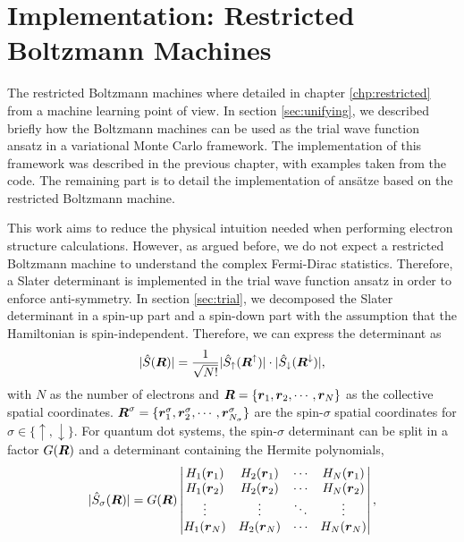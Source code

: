 \chapter{Implementation: Restricted Boltzmann Machines} \label{chp:rbmimplementation}
The restricted Boltzmann machines where detailed in chapter \ref{chp:restricted} from a machine learning point of view. In section \ref{sec:unifying}, we described briefly how the Boltzmann machines can be used as the trial wave function ansatz in a variational Monte Carlo framework. The implementation of this framework was described in the previous chapter, with examples taken from the code. The remaining part is to detail the implementation of ansätze based on the restricted Boltzmann machine. 

This work aims to reduce the physical intuition needed when performing electron structure calculations. However, as argued before, we do not expect a restricted Boltzmann machine to understand the complex Fermi-Dirac statistics. Therefore, a Slater determinant is implemented in the trial wave function ansatz in order to enforce anti-symmetry. In section \ref{sec:trial}, we decomposed the Slater determinant in a spin-up part and a spin-down part with the assumption that the Hamiltonian is spin-independent. Therefore, we can express the determinant as
\begin{equation}
|\hat{S}(\boldsymbol{{R}})|=\frac{1}{\sqrt{N!}}|\hat{S}_{\uparrow}(\boldsymbol{{R}}^{\uparrow})|\cdot |\hat{S}_{\downarrow}(\boldsymbol{{R}}^{\downarrow})|,
\end{equation}
with $N$ as the number of electrons and $\boldsymbol{{R}}=\{\boldsymbol{{r}}_1,\boldsymbol{{r}}_2,\cdots,\boldsymbol{{r}}_N\}$ as the collective spatial coordinates. $\boldsymbol{{R}}^{\sigma}=\{\boldsymbol{{r}}_1^{\sigma},\boldsymbol{{r}}_2^{\sigma},\cdots,\boldsymbol{{r}}_{N_{\sigma}}^{\sigma}\}$ are the spin-$\sigma$ spatial coordinates for $\sigma\in\{\uparrow,\downarrow\}$. For quantum dot systems, the spin-$\sigma$ determinant can be split in a factor $G(\boldsymbol{{R}})$ and a determinant containing the Hermite polynomials,
\begin{equation}
|\hat{S}_{\sigma}(\boldsymbol{{R}})|=G(\boldsymbol{{R}})
\begin{vmatrix}
H_1(\boldsymbol{r}_1) & H_2(\boldsymbol{r}_1) & \cdots & H_N(\boldsymbol{r}_1)\\
H_1(\boldsymbol{r}_2) & H_2(\boldsymbol{r}_2) & \cdots & H_N(\boldsymbol{r}_2)\\
\vdots & \vdots & \ddots & \vdots \\
H_1(\boldsymbol{r}_N) & H_2(\boldsymbol{r}_N) & \cdots & H_N(\boldsymbol{r}_N)
\end{vmatrix},
\end{equation}
